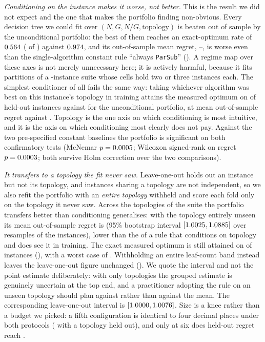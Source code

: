 \documentclass[journal,10pt]{IEEEtran}
\theoremstyle{plain}
\theoremstyle{definition}
\theoremstyle{remark}
\newcommand{\sv}[1]{\texttt{#1}}
\begin{document}
\emph{Conditioning on the instance makes it worse, not better.} This is the
result we did not expect and the one that makes the portfolio finding
non-obvious. Every decision tree we could fit over $(N, G, N/G,
\text{topology})$ is beaten out of sample by the unconditional portfolio: the
best of them reaches an exact-optimum rate of $0.564$
(\SelTreeOpt{} of \TournNInst{}) against $0.974$, and its
out-of-sample mean regret, \SelTreeMeanLo{}--\SelTreeMeanHi{}, is worse even
than the single-algorithm constant rule ``always \sv{ParSub}''
(\SelConstMean{}). A regime map over these axes is not merely unnecessary
here; it is actively harmful, because it fits partitions of a
\TournNInst{}-instance suite whose cells hold two or three instances each. The
simplest conditioner of all fails the same way: taking whichever algorithm was
best on this instance's topology in training attains the measured optimum on
\SelCondTopoOpt{} of \TournNInst{} held-out instances against \SelKFourOpt{}
for the unconditional portfolio, at mean out-of-sample regret
\SelCondTopoMean{} against \SelKFourMean{}. Topology is the one axis on which
conditioning is most intuitive, and it is the axis on which conditioning most
clearly does not pay.
Against the two pre-specified constant baselines the portfolio is
significant on both confirmatory tests (McNemar $p = 0.0005$; Wilcoxon
signed-rank on regret $p = 0.0003$; both survive Holm correction over
the two comparisons).

\emph{It transfers to a topology the fit never saw.} Leave-one-out holds out
an instance but not its topology, and instances sharing a topology are not
independent, so we also refit the portfolio with an \emph{entire topology}
withheld and score each fold only on the topology it never saw. Across the
\SelTopoGroups{} topologies of the suite the portfolio transfers better than
conditioning generalises: with the topology entirely unseen its mean
out-of-sample regret is \SelUnseenTopoMean{} (95\% bootstrap interval
$[1.0025, 1.0885]$ over \SelBootReps{} resamples of the
\TournNInst{} instances), lower than the \SelCondTopoMean{} of a rule that
conditions on topology and does see it in training. The exact measured optimum
is still attained on \SelUnseenTopoOpt{} of \TournNInst{} instances
(\SelUnseenTopoPct{}), with a worst case of \SelUnseenTopoWorst{}. Withholding an entire leaf-count band
instead leaves the leave-one-out figure unchanged (\SelUnseenScaleMean{}).
We quote the interval and not the point estimate deliberately: with only
\SelTopoGroups{} topologies the grouped estimate is genuinely uncertain at the
top end, and a practitioner adopting the rule on an unseen topology should
plan against \SelUnseenTopoHi{} rather than against the mean. The
corresponding leave-one-out interval is $[1.0000, 1.0076]$. Size
\SelKnee{} is a knee rather than a budget we picked: a fifth configuration is
identical to four decimal places under both protocols (\SelKneeNextMean{} with
a topology held out), and only at six does held-out regret reach
\SelKSixMean{}.
\end{document}
